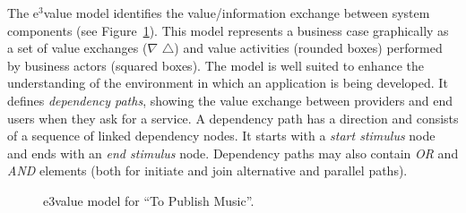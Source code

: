 \documentclass{singlecol-new}
\theoremstyle{TH}{
\newtheorem{lemma}{Lemma}
\newtheorem{theorem}[lemma]{Theorem}
\newtheorem{corrolary}[lemma]{Corrolary}
\newtheorem{conjecture}[lemma]{Conjecture}
\newtheorem{proposition}[lemma]{Proposition}
\newtheorem{claim}[lemma]{Claim}
\newtheorem{stheorem}[lemma]{Wrong Theorem}
\newtheorem{algorithm}{Algorithm}
}
\theoremstyle{THrm}{
\newtheorem{definition}{Definition}[section]
\newtheorem{question}{Question}[section]
\newtheorem{remark}{Remark}
\newtheorem{scheme}{Scheme}
}
\theoremstyle{THhit}{
\newtheorem{case}{Case}[section]
}
\theoremstyle{THhsl}{
\newtheorem{example}{Example}
}
\begin{document}
The e$^3$value model  identifies the value/in\-for\-ma\-tion  exchange between system components (see Figure~\ref{fig:CIM:tpme3v}).
This model  represents a business case graphically as a set of value exchanges  ($\nabla$ $\triangle$) and value activities (rounded boxes) performed by business actors (squared boxes).
The model is well suited to enhance the understanding of the environment in which an application is being developed.
It defines \textit{dependency paths}, showing the value exchange between providers and end users when they ask for a service.
A dependency path has a direction and consists of a sequence of linked dependency nodes.
It starts with a \textit{start stimulus} node and ends with an \textit{end stimulus} node.
Dependency paths may also contain \textsl{OR} and \textsl{AND} elements (both for initiate and join alternative and parallel paths).

\begin{figure}[h]
\center
{}
 
\caption{\label{fig:CIM:tpme3v} e3value model for ``To Publish Music''.}
\end{figure}
\end{document}
